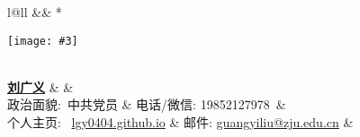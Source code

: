\newcommand{\paint}[3]{
    \begin{minipage}{#1}
        \texttt{[image: \#3]}
    \end{minipage} 
}
\newcommand{\myheader}{
\begin{tabular*}{\textwidth}{l@{\extracolsep{\fill}}ll}
  && \multirow{4}*{\paint{2.5cm}{3.5cm}{./刘广义-蓝底-1寸.jpg}}\\
  \specialrule{0em}{4pt}{4pt}
  \textbf{\href{}{\LARGE 刘广义}} &  &\\

  
  政治面貌: $\,${中共党员} &  电话/微信: 19852127978$\,${\color{labelgrey}}
  & \\
  个人主页:  $\,${  \href{https://lgy0404.github.io/}{lgy0404.github.io} } & 邮件: \href{mailto:guangyiliu@zju.edu.cn}{guangyiliu@zju.edu.cn} 
 & \\
  \end{tabular*}\\\vspace{0.1in}

}

\myheader

